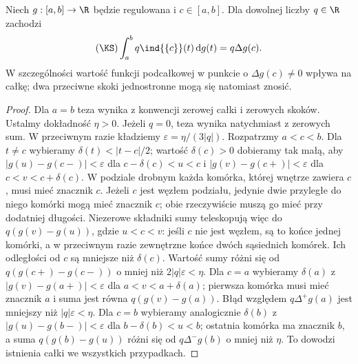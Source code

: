 \begin{lemat}
\label{lem:ks-point}
Niech $g:[a,b]\to\R$ będzie regulowana i $c\in[a,b]$. Dla dowolnej liczby $q\in\R$ zachodzi
\[
 (\KS)\int_a^b q\ind{\{c\}}(t)\,\mathrm dg(t)=q\Delta g(c).
\]
W szczególności wartość funkcji podcałkowej w punkcie o $\Delta g(c)\ne0$ wpływa na całkę; dwa przeciwne skoki jednostronne mogą się natomiast znosić.
\end{lemat}
\begin{proof}
Dla $a=b$ teza wynika z konwencji zerowej całki i zerowych skoków. Ustalmy dokładność $\eta>0$. Jeżeli $q=0$, teza wynika natychmiast z zerowych sum. W przeciwnym razie kładziemy $\varepsilon=\eta/(3|q|)$. Rozpatrzmy $a<c<b$. Dla $t\ne c$ wybieramy $\delta(t)<|t-c|/2$; wartość $\delta(c)>0$ dobieramy tak małą, aby $|g(u)-g(c-)|<\varepsilon$ dla $c-\delta(c)<u<c$ i $|g(v)-g(c+)|<\varepsilon$ dla $c<v<c+\delta(c)$. W podziale drobnym każda komórka, której wnętrze zawiera $c$, musi mieć znacznik $c$. Jeżeli $c$ jest węzłem podziału, jedynie dwie przyległe do niego komórki mogą mieć znacznik $c$; obie rzeczywiście muszą go mieć przy dodatniej długości. Niezerowe składniki sumy teleskopują więc do $q(g(v)-g(u))$, gdzie $u<c<v$: jeśli $c$ nie jest węzłem, są to końce jednej komórki, a w przeciwnym razie zewnętrzne końce dwóch sąsiednich komórek. Ich odległości od $c$ są mniejsze niż $\delta(c)$. Wartość sumy różni się od $q(g(c+)-g(c-))$ o mniej niż $2|q|\varepsilon<\eta$. Dla $c=a$ wybieramy $\delta(a)$ z $|g(v)-g(a+)|<\varepsilon$ dla $a<v<a+\delta(a)$; pierwsza komórka musi mieć znacznik $a$ i suma jest równa $q(g(v)-g(a))$. Błąd względem $q\Delta^+g(a)$ jest mniejszy niż $|q|\varepsilon<\eta$. Dla $c=b$ wybieramy analogicznie $\delta(b)$ z $|g(u)-g(b-)|<\varepsilon$ dla $b-\delta(b)<u<b$; ostatnia komórka ma znacznik $b$, a suma $q(g(b)-g(u))$ różni się od $q\Delta^-g(b)$ o mniej niż $\eta$. To dowodzi istnienia całki we wszystkich przypadkach.
\end{proof}

